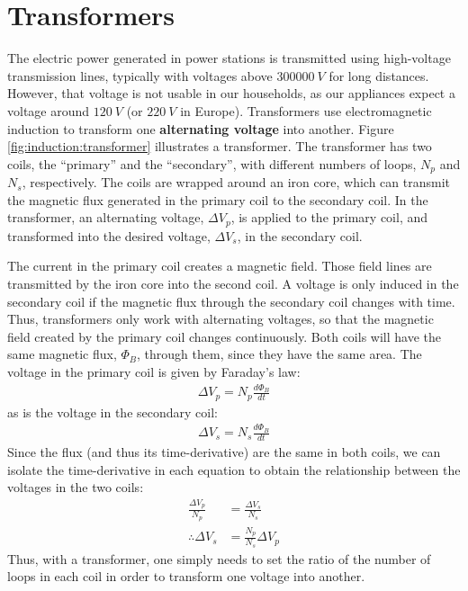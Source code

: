 \section{Transformers}
The electric power generated in power stations is transmitted using high-voltage transmission lines, typically with voltages above $\SI{300000}{V}$ for long distances. However, that voltage is not usable in our households, as our appliances expect a voltage around $\SI{120}{V}$ (or $\SI{220}{V}$ in Europe). Transformers use electromagnetic induction to transform one \textbf{alternating voltage} into another. Figure \ref{fig:induction:transformer} illustrates a transformer.
The transformer has two coils, the ``primary'' and the ``secondary'', with different numbers of loops, $N_p$ and $N_s$, respectively. The coils are wrapped around an iron core, which can transmit the magnetic flux generated in the primary coil to the secondary coil. In the transformer, an alternating voltage, $\Delta V_p$, is applied to the primary coil, and transformed into the desired voltage, $\Delta V_s$, in the secondary coil. 

The current in the primary coil creates a magnetic field. Those field lines are transmitted by the iron core into the second coil. A voltage is only induced in the secondary coil if the magnetic flux through the secondary coil changes with time. Thus, transformers only work with alternating voltages, so that the magnetic field created by the primary coil changes continuously. Both coils will have the same magnetic flux, $\Phi_B$, through them, since they have the same area. The voltage in the primary coil is given by Faraday's law:
\begin{align*}
\Delta V_p = N_p \frac{d\Phi_B}{dt}
\end{align*}
as is the voltage in the secondary coil:
\begin{align*}
\Delta V_s = N_s \frac{d\Phi_B}{dt}
\end{align*}
Since the flux (and thus its time-derivative) are the same in both coils, we can isolate the time-derivative in each equation to obtain the relationship between the voltages in the two coils:
\begin{align*}
\frac{\Delta V_p}{N_p}&=\frac{\Delta V_s}{N_s}\\
\therefore \Delta V_s &= \frac{N_p}{N_s}\Delta V_p
\end{align*}
Thus, with a transformer, one simply needs to set the ratio of the number of loops in each coil in order to transform one voltage into another.


